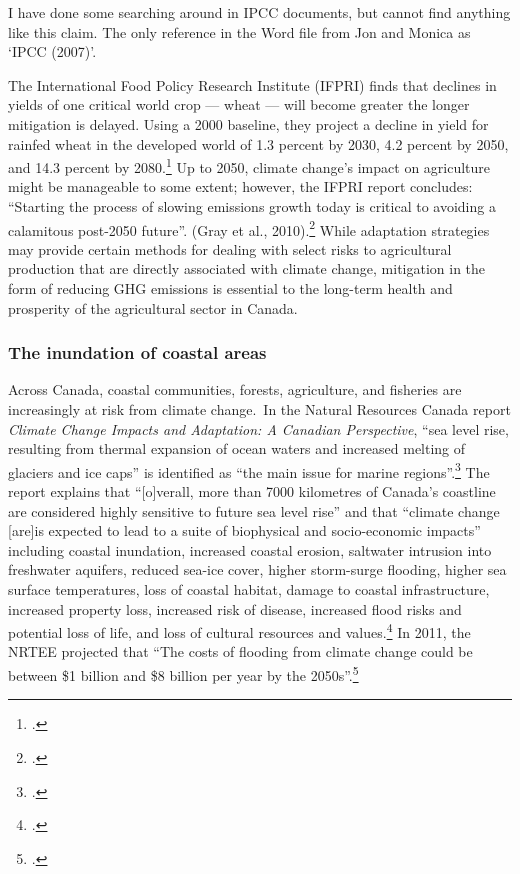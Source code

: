 \begin{vcom}		
I have done some searching around in IPCC documents, but cannot find anything like this claim. The only reference in the Word file from Jon and Monica as `IPCC (2007)'.
\end{vcom}

The International Food Policy Research Institute (IFPRI) finds that declines in yields of one critical world crop --- wheat --- will become greater the longer mitigation is delayed. 
Using a 2000 baseline, they project a decline in yield for rainfed wheat in the developed world of 1.3 percent by 2030, 4.2 percent by 2050, and 14.3 percent by 2080.\footcite[][p. 85]{Farming2050}
Up to 2050, climate change's impact on agriculture might be manageable to some extent; however, the IFPRI report concludes: ``Starting the process of slowing emissions growth today is critical to avoiding a calamitous post-2050 future''. (Gray et al., 2010).\footcite[][p. 86]{Farming2050}
While adaptation strategies may provide certain methods for dealing with select risks to agricultural production that are directly associated with climate change, mitigation in the form of reducing GHG emissions is essential to the long-term health and prosperity of the agricultural sector in Canada.



	\subsubsection{The inundation of coastal areas}
	
	
	
Across Canada, coastal communities, forests, agriculture, and fisheries are increasingly at risk from climate change.\
In the Natural Resources Canada report \emph{Climate Change Impacts and Adaptation: A Canadian Perspective}, ``sea level rise, resulting from thermal expansion of ocean waters and increased melting of glaciers and ice caps'' is identified as ``the main issue for marine regions''.\footcite[][p. xvi]{Lemmen2010}
The report explains that ``[o]verall, more than 7000 kilometres of Canada's coastline are considered highly sensitive to future sea level rise'' and that ``climate change [are]is expected to lead to a suite of biophysical and socio-economic impacts'' including coastal inundation, increased coastal erosion, saltwater intrusion into freshwater aquifers, reduced sea-ice cover, higher storm-surge flooding, higher sea surface temperatures, loss of coastal habitat, damage to coastal infrastructure, increased property loss, increased risk of disease, increased flood risks and potential loss of life, and loss of cultural resources and values.\footcite[][p. xvii]{Lemmen2010}
In 2011, the NRTEE projected that ``The costs of flooding from climate change could be between \$1 billion and \$8 billion per year by the 2050s''.\footcite[][p.16]{NRTEEPrice}


